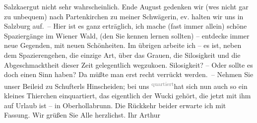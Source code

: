 \begin{ledgroupsized}[t]{13cm}
                  Salzka{\geminationm}ergut
               nicht sehr wahrscheinlich. Ende August gedenken wir (we{\geminationn}s nicht gar zu unbequem) nach Partenkirchen zu meiner Schwägerin, ev. halten wir uns in Salzburg auf. – Hier ist es ganz erträglich, ich mache (fast
               immer allein) schöne Spaziergänge im Wiener Wald,
               (den Sie kennen lernen sollten) – entdecke immer neue Gegenden, mit neuen
               Schönheiten. Im übrigen arbeite ich – es ist, neben dem Spazierengehen, die einzige
               Art, über das Grauen, die Si{\geminationn}losigkeit und die
               Abgeschmacktheit dieser Zeit gelegentlich wegzuko{\geminationm}en.
                  Si{\geminationn}losigkeit? – Oder sollte es doch einen Sinn haben?
                  Da{\geminationn} müßte man erst recht verrückt werden. – Nehmen
               Sie unser Beileid zu Schufterls Hinscheiden; bei uns \substVorne{}\textsuperscript{\textcolor{gray}{quartiert}}{\allowbreak}\substDazwischen{}hat\substHinten{} sich \introOben{}nun\introOben{} auch so ein kleines Thierchen
               einquartiert, das eigentlich der Wucki gehört,
               die jetzt mit ihm auf Urlaub ist – in Oberhollabrunn. Die Rückkehr beider erwarte ich mit Fassung.\pend
           \pstart
           Wir grüßen Sie Alle herzlichst.\pend
           \pstart Ihr \spacefill\mbox{Arthur}\pend{}
         
         \endnumbering{}\end{ledgroupsized}  \newcommand{\dateiname}{L02267}\newcommand{\titel}{Arthur Schnitzler an Richard Beer-Hofmann, 23. 7. 1917}\newcommand{\editorInnen}{Martin Anton Müller und Gerd-Hermann Susen}
      